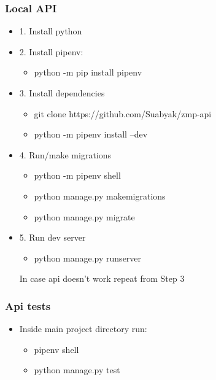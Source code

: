 \documentclass{article}
\begin{document}
\subsubsection{Local API}
\begin{itemize}
\item 1. Install python
\item 2. Install pipenv:
\begin{itemize}
    \item python -m pip install pipenv
\end{itemize}

\item 3. Install dependencies

\begin{itemize}
    \item git clone https://github.com/Suabyak/zmp-api
    \item python -m pipenv install --dev
\end{itemize}

\item 4. Run/make migrations

\begin{itemize}
    \item python -m pipenv shell
    \item python manage.py makemigrations
    \item python manage.py migrate
\end{itemize}

\item 5. Run dev server

\begin{itemize}
    \item python manage.py runserver
\end{itemize}

In case api doesn't work repeat from Step 3

\end{itemize}
\subsubsection{Api tests}
\begin{itemize}
    \item Inside main project directory run:
    \begin{itemize}
        \item pipenv shell
        \item python manage.py test
    \end{itemize}
\end{itemize}
\end{document}
